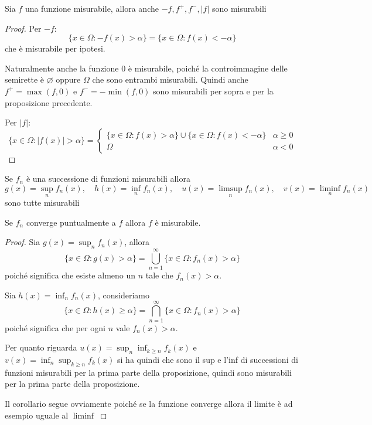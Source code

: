 \begin{proposition}
    Sia \(f\) una funzione misurabile, allora anche \(-f, f^{+}, f^{-}, |f|\)
    sono misurabili
\end{proposition}
\begin{proof}
    Per \(-f\):
    \[
        \{x \in \Omega : -f(x) > \alpha\} = \{x \in \Omega : f(x) < -\alpha\}
    \]
    che è misurabile per ipotesi.

    Naturalmente anche la funzione \(0\) è misurabile, poiché la controimmagine
    delle semirette è \(\varnothing\) oppure \(\Omega\) che sono entrambi
    misurabili. Quindi anche \(f^{+} = \max(f, 0)\) e \(f^{-} = -\min(f, 0)\)
    sono misurabili per sopra e per la proposizione precedente.

    Per \(|f|\):
    \[
    \{x \in \Omega: |f(x)| > \alpha\}  = \begin{cases}
        \{x \in \Omega : f(x) > \alpha\} \cup \{x \in \Omega : f(x) < -\alpha\}
        & \alpha \ge  0 \\
        \Omega & \alpha < 0
    \end{cases}
    \]
\end{proof}

\begin{proposition}
    Se \(f_{n}\) è una successione di funzioni misurabili allora
    \[g(x)=\sup_{n}f_{n}(x), \quad h(x)=\inf_{n}f_{n}(x),\quad
        u(x)=\limsup_{n}f_{n}(x),\quad
    v(x)=\liminf_{n}f_{n}(x)\] sono tutte misurabili
\end{proposition}
\begin{corollary}
    Se \(f_{n}\) converge puntualmente a \(f\) allora \(f\) è misurabile.
\end{corollary}
\begin{proof}
    Sia \(g(x) = \sup_n f_{n}(x)\), allora
    \[
        \{x \in \Omega : g(x) > \alpha\} = \bigcup_{n=1}^{\infty} \{x \in \Omega
        : f_{n}(x) > \alpha\}
    \]
    poiché significa che esiste almeno un \(n\) tale che \(f_{n}(x) > \alpha\). 

    Sia \(h(x) = \inf_{n} f_{n}(x)\), consideriamo
    \[
        \{x \in \Omega : h(x) \ge \alpha\} = \bigcap_{n=1}^{\infty} \{x \in
        \Omega : f_{n}(x) > \alpha\}
    \]
    poiché significa che per ogni \(n\) vale \(f_{n}(x) > \alpha\).

    Per quanto riguarda \(u(x) = \sup_n \inf_{k \ge n} f_k(x)\) e \(v(x) =
    \inf_n \sup_{k \ge n} f_k(x)\) si ha quindi che sono il sup e l'inf di
    successioni di funzioni misurabili per la prima parte della proposizione, quindi
    sono misurabili per la prima parte della proposizione.

    Il corollario segue ovviamente poiché se la funzione converge allora il
    limite è ad esempio uguale al \(\liminf\) 
\end{proof}


